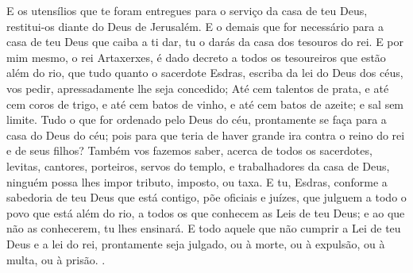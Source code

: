 {{{{  E os utensílios que te foram entregues para o serviço da casa de teu Deus, restitui-os diante do Deus de Jerusalém.
  E o demais que for necessário para a casa de teu Deus que caiba a ti dar, tu o darás da casa dos tesouros do rei.
  E por mim mesmo, o rei Artaxerxes, é dado decreto a todos os tesoureiros que estão além do rio, que tudo quanto o sacerdote Esdras, escriba da lei do Deus dos céus, vos pedir, apressadamente lhe seja concedido;
  Até cem talentos de prata, e até cem coros de trigo, e até cem batos de vinho, e até cem batos de azeite; e sal sem limite.
  Tudo o que for ordenado pelo Deus do céu, prontamente se faça para a casa do Deus do céu; pois para que teria de haver grande ira contra o reino do rei e de seus filhos?
  Também vos fazemos saber, acerca de todos os sacerdotes, levitas, cantores, porteiros, servos do templo, e trabalhadores da casa de Deus, ninguém possa lhes impor tributo, imposto, ou taxa.
  E tu, Esdras, conforme a sabedoria de teu Deus que está contigo, põe oficiais e juízes, que julguem a todo o povo que está além do rio, a todos os que conhecem as Leis de teu Deus; e ao que não as conhecerem, tu lhes ensinará.
  E todo aquele que não cumprir a Lei de teu Deus e a lei do rei, prontamente seja julgado, ou à morte, ou à expulsão, ou à multa, ou à prisão}}}.
  .
\par }

